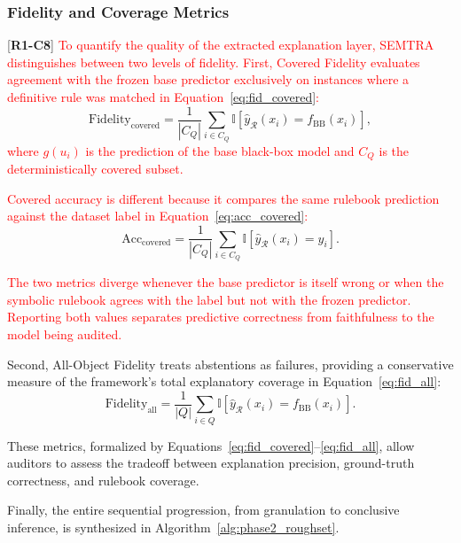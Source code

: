 \documentclass[make,article,submit,pdftex,moreauthors]{Definitions/mdpi}
\newcommand{\Rule}{\mathcal{R}}
\newcommand{\revtag}[2]{[\textbf{R#1-C#2}]}
\newcommand{\Rone}[1]{\textcolor{red}{#1}}
\begin{document}
\subsubsection{Fidelity and Coverage Metrics}

\revtag{1}{8} \Rone{To quantify the quality of the extracted explanation layer, SEMTRA distinguishes between two levels of fidelity. First, Covered Fidelity evaluates agreement with the frozen base predictor exclusively on instances where a definitive rule was matched in Equation~\eqref{eq:fid_covered}:}
\begin{equation}
 \label{eq:fid_covered}
 \mathrm{Fidelity}_{\mathrm{covered}} = \frac{1}{|C_Q|}\sum_{i \in C_Q}\mathbb{I}[\hat{y}_{\Rule}(x_i) = f_{\mathrm{BB}}(x_i)],
\end{equation}
\Rone{where $g(u_i)$ is the prediction of the base black-box model and $C_Q$ is the deterministically covered subset.}

\Rone{Covered accuracy is different because it compares the same rulebook prediction against the dataset label in Equation~\eqref{eq:acc_covered}:}
\begin{equation}
 \label{eq:acc_covered}
 \mathrm{Acc}_{\mathrm{covered}} = \frac{1}{|C_Q|}\sum_{i \in C_Q}\mathbb{I}[\hat{y}_{\Rule}(x_i) = y_i].
\end{equation}

\Rone{The two metrics diverge whenever the base predictor is itself wrong or when the symbolic rulebook agrees with the label but not with the frozen predictor. Reporting both values separates predictive correctness from faithfulness to the model being audited.}

Second, All-Object Fidelity treats abstentions as failures, providing a conservative measure of the framework's total explanatory coverage in Equation~\eqref{eq:fid_all}:
\begin{equation}
 \label{eq:fid_all}
 \mathrm{Fidelity}_{\mathrm{all}} = \frac{1}{|Q|}\sum_{i \in Q}\mathbb{I}[\hat{y}_{\Rule}(x_i) = f_{\mathrm{BB}}(x_i)].
\end{equation}

These metrics, formalized by Equations~\eqref{eq:fid_covered}--\eqref{eq:fid_all}, allow auditors to assess the tradeoff between explanation precision, ground-truth correctness, and rulebook coverage.

Finally, the entire sequential progression, from granulation to conclusive inference, is synthesized in Algorithm~\ref{alg:phase2_roughset}.
\end{document}
